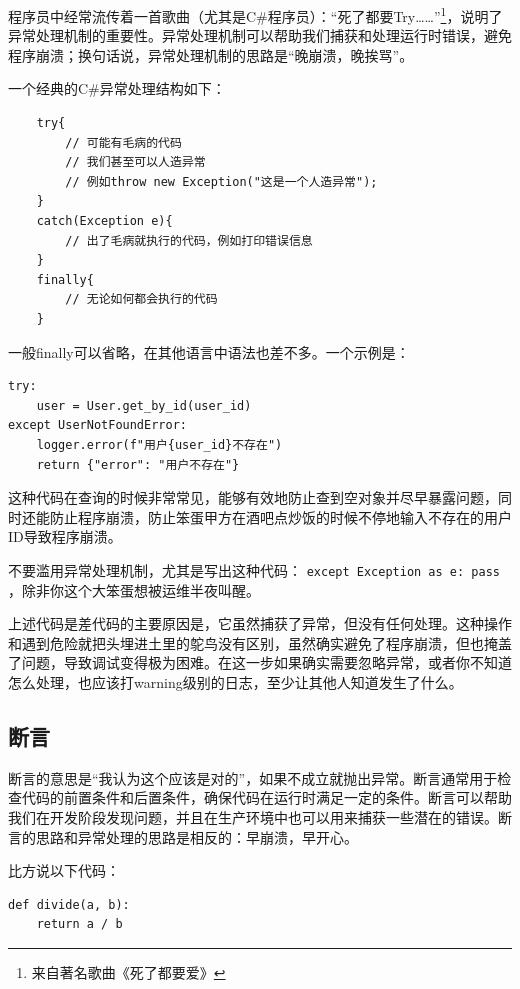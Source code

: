 程序员中经常流传着一首歌曲（尤其是C\#程序员）：“死了都要Try……”\footnote{来自著名歌曲《死了都要爱》}，说明了异常处理机制的重要性。异常处理机制可以帮助我们捕获和处理运行时错误，避免程序崩溃；换句话说，异常处理机制的思路是“晚崩溃，晚挨骂”。

一个经典的C\#异常处理结构如下：
\begin{verbatim}
    try{
        // 可能有毛病的代码
        // 我们甚至可以人造异常
        // 例如throw new Exception("这是一个人造异常");
    }
    catch(Exception e){
        // 出了毛病就执行的代码，例如打印错误信息
    }
    finally{
        // 无论如何都会执行的代码
    }
\end{verbatim}

一般finally可以省略，在其他语言中语法也差不多。一个示例是：
\begin{verbatim}
try:
    user = User.get_by_id(user_id)
except UserNotFoundError:
    logger.error(f"用户{user_id}不存在")
    return {"error": "用户不存在"}
\end{verbatim}

这种代码在查询的时候非常常见，能够有效地防止查到空对象并尽早暴露问题，同时还能防止程序崩溃，防止笨蛋甲方在酒吧点炒饭的时候不停地输入不存在的用户ID导致程序崩溃。

\begin{caution}
  不要滥用异常处理机制，尤其是写出这种代码： \texttt{except Exception as e: pass} ，除非你这个大笨蛋想被运维半夜叫醒。

  上述代码是差代码的主要原因是，它虽然捕获了异常，但没有任何处理。这种操作和遇到危险就把头埋进土里的鸵鸟没有区别，虽然确实避免了程序崩溃，但也掩盖了问题，导致调试变得极为困难。在这一步如果确实需要忽略异常，或者你不知道怎么处理，也应该打warning级别的日志，至少让其他人知道发生了什么。
\end{caution}

\subsection{断言}

断言的意思是“我认为这个应该是对的”，如果不成立就抛出异常。断言通常用于检查代码的前置条件和后置条件，确保代码在运行时满足一定的条件。断言可以帮助我们在开发阶段发现问题，并且在生产环境中也可以用来捕获一些潜在的错误。断言的思路和异常处理的思路是相反的：早崩溃，早开心。

比方说以下代码：

\begin{verbatim}
def divide(a, b):
    return a / b
\end{verbatim}

